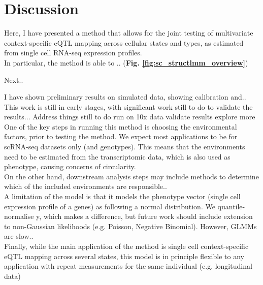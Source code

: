 \clearpage

\section{Discussion}

Here, I have presented a method that allows for the joint testing of multivariate context-specific eQTL mapping across cellular states and types, as estimated from single cell RNA-seq expression profiles.\\

In particular, the method is able to .. (\textbf{Fig. \ref{fig:sc_structlmm_overview}})

Next..

I have shown preliminary results on simulated data, showing calibration and..\\

This work is still in early stages, with significant work still to do to validate the results...
Address things still to do 
run on 10x data
validate results
explore more \\

One of the key steps in running this method is choosing the environmental factors, prior to testing the method.
We expect most applications to be for scRNA-seq datasets only (and genotypes).
This means that the environments need to be estimated from the transcriptomic data, which is also used as phenotype, causing concerns of circularity.\\

On the other hand, downstream analysis steps may include methods to determine which of the included environments are responsible..\\

A limitation of the model is that it models the phenotype vector (single cell expression profile of a genes) as following a normal distribution.
We quantile-normalise y, which makes a difference, but future work should include extension to non-Gaussian likelihoods (e.g. Poisson, Negative Binomial).
However, GLMMs are slow..\\

Finally, while the main application of the method is single cell context-specific eQTL mapping across several states, this model is in principle flexible to any application with repeat measurements for the same individual (e.g. longitudinal data)
